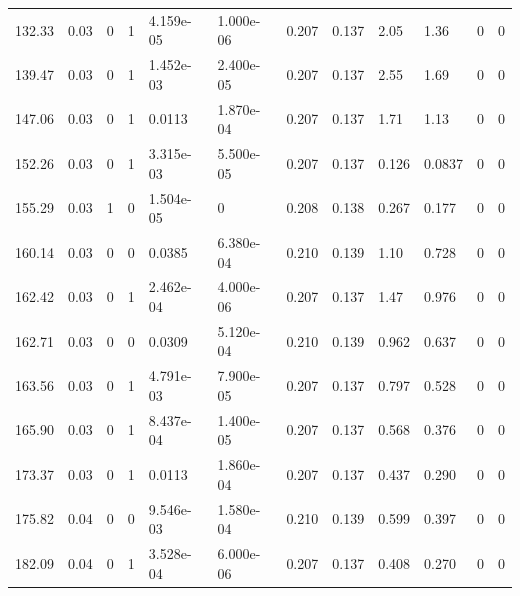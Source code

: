 \documentclass[preview]{standalone}
\begin{document}
{{\begin{tabular}{L{1.2cm}C{1.2cm} C{0.3cm}C{0.5cm} C{1.4cm}C{1.4cm} C{1.4cm}C{1.4cm} C{1.6cm}C{1.6cm} C{1.6cm}C{1.6cm}}
  132.33  &  0.03  & 0     &  1 &  4.159e-05  & 1.000e-06  &  0.207&   0.137& 2.05 & 1.36   &  0 & 0  \\ 
  139.47  &  0.03  & 0     &  1 &  1.452e-03  & 2.400e-05  &  0.207&   0.137& 2.55 & 1.69   &  0 & 0  \\ 
  147.06  &  0.03  & 0     &  1 &  0.0113  & 1.870e-04  &  0.207&   0.137& 1.71 & 1.13   &  0 & 0  \\ 
  152.26  &  0.03  & 0     &  1 &  3.315e-03  & 5.500e-05  &  0.207&   0.137& 0.126 & 0.0837   &  0 & 0  \\ 
  155.29  &  0.03  & 1     &  0 &  1.504e-05  & 0  &  0.208&   0.138& 0.267 & 0.177   &  0 & 0  \\ 
  160.14  &  0.03  & 0     &  0 &  0.0385  & 6.380e-04  &  0.210&   0.139& 1.10 & 0.728   &  0 & 0  \\ 
  162.42  &  0.03  & 0     &  1 &  2.462e-04  & 4.000e-06  &  0.207&   0.137& 1.47 & 0.976   &  0 & 0  \\ 
  162.71  &  0.03  & 0     &  0 &  0.0309  & 5.120e-04  &  0.210&   0.139& 0.962 & 0.637   &  0 & 0  \\ 
  163.56  &  0.03  & 0     &  1 &  4.791e-03  & 7.900e-05  &  0.207&   0.137& 0.797 & 0.528   &  0 & 0  \\ 
  165.90  &  0.03  & 0     &  1 &  8.437e-04  & 1.400e-05  &  0.207&   0.137& 0.568 & 0.376   &  0 & 0  \\ 
  173.37  &  0.03  & 0     &  1 &  0.0113  & 1.860e-04  &  0.207&   0.137& 0.437 & 0.290   &  0 & 0  \\ 
  175.82  &  0.04  & 0     &  0 &  9.546e-03  & 1.580e-04  &  0.210&   0.139& 0.599 & 0.397   &  0 & 0  \\ 
  182.09  &  0.04  & 0     &  1 &  3.528e-04  & 6.000e-06  &  0.207&   0.137& 0.408 & 0.270   &  0 & 0  \\ 
\hline 
\end{tabular} 

}}
\end{document}
